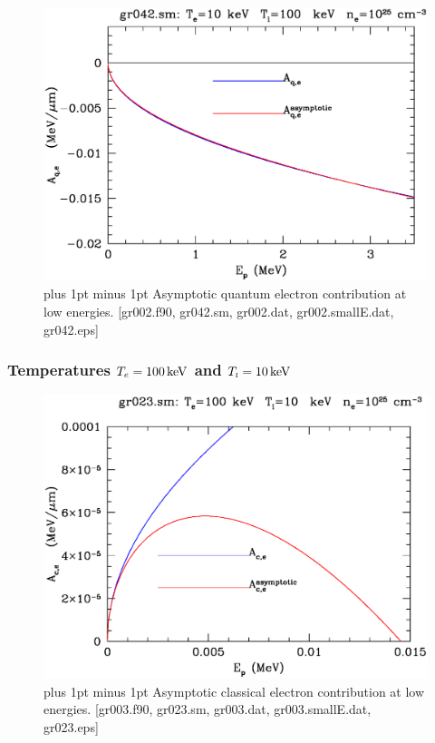 \documentclass[preprint,12pt,eqsecnum,nofootinbib,amsmath,amssymb]{revtex4}
\newcommand{\smI}{{\rm\scriptscriptstyle I}}
\newcommand{\footnoteskip}{\baselineskip 12pt plus 1pt minus 1pt}
\begin{document}
\vskip-2cm 
\begin{figure}[h!]
\includegraphics[scale=0.45]{gr042.eps} 
\vskip-0.8cm 
\caption{\footnoteskip  
  Asymptotic quantum electron contribution at low
  energies. [gr002.f90, gr042.sm, gr002.dat, gr002.smallE.dat,
  gr042.eps]
}
\label{fig:gr042}
\end{figure}


\pagebreak
\subsubsection{Temperatures $T_e=100\,{\rm keV}$ and $T_\smI=10\,{\rm keV}$}

\vskip-2cm 
\begin{figure}[h!]
\includegraphics[scale=0.45]{gr023.eps} 
\vskip-0.5cm 
\caption{\footnoteskip  
  Asymptotic classical electron contribution at low
  energies. [gr003.f90, gr023.sm, gr003.dat, gr003.smallE.dat,
  gr023.eps]
}
\label{fig:gr023}
\end{figure}
\end{document}
